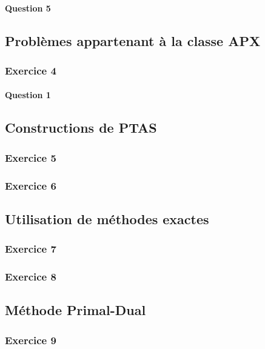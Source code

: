 \documentclass[a4paper, 12pt]{article}
\begin{document}
\paragraph{Question 5}

\subsection{Problèmes appartenant à la classe APX}

\subsubsection*{Exercice 4}

\paragraph{Question 1}

\subsection{Constructions de PTAS}

\subsubsection*{Exercice 5}

\subsubsection*{Exercice 6}

\subsection{Utilisation de méthodes exactes}

\subsubsection*{Exercice 7}

\subsubsection*{Exercice 8}

\subsection{Méthode Primal-Dual}

\subsubsection*{Exercice 9}
\end{document}
